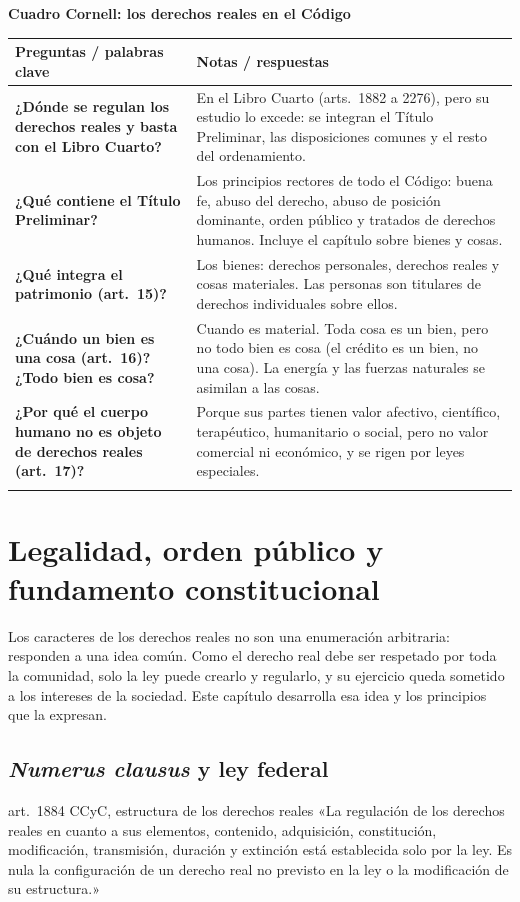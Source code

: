 \documentclass[12pt,oneside]{book}
\renewcommand{\arraystretch}{1.25}
\newcommand{\cq}[2]{\textbf{#1} & #2 \\[0.45em]}
\newcommand{\cornell}[3]{%
\par\bigskip\noindent\textbf{\large Cuadro Cornell: #1}\par\smallskip
\begin{center}
\small
\renewcommand{\arraystretch}{1.15}
\begin{tabularx}{\textwidth}{>{\raggedright\arraybackslash}p{0.27\textwidth}>{\raggedright\arraybackslash}X}
\toprule
\textbf{Preguntas / palabras clave} & \textbf{Notas / respuestas} \\
\midrule
#2
\midrule
\multicolumn{2}{p{\dimexpr\textwidth-2\tabcolsep\relax}}{\textbf{Resumen.} #3} \\
\bottomrule
\end{tabularx}
\end{center}
}
\begin{document}
\cornell{los derechos reales en el Código}{
\cq{¿Dónde se regulan los derechos reales y basta con el Libro Cuarto?}{En el Libro Cuarto (arts.~1882 a 2276), pero su estudio lo excede: se integran el Título Preliminar, las disposiciones comunes y el resto del ordenamiento.}
\cq{¿Qué contiene el Título Preliminar?}{Los principios rectores de todo el Código: buena fe, abuso del derecho, abuso de posición dominante, orden público y tratados de derechos humanos. Incluye el capítulo sobre bienes y cosas.}
\cq{¿Qué integra el patrimonio (art.~15)?}{Los bienes: derechos personales, derechos reales y cosas materiales. Las personas son titulares de derechos individuales sobre ellos.}
\cq{¿Cuándo un bien es una cosa (art.~16)? ¿Todo bien es cosa?}{Cuando es material. Toda cosa es un bien, pero no todo bien es cosa (el crédito es un bien, no una cosa). La energía y las fuerzas naturales se asimilan a las cosas.}
\cq{¿Por qué el cuerpo humano no es objeto de derechos reales (art.~17)?}{Porque sus partes tienen valor afectivo, científico, terapéutico, humanitario o social, pero no valor comercial ni económico, y se rigen por leyes especiales.}
}{Los derechos reales se regulan en el Libro Cuarto, cuyos arts.~1882 a 1891 contienen los principios comunes. Los arts.~15, 16 y 17 fijan la titularidad sobre los bienes del patrimonio, el concepto de cosa como bien material con valor económico y la exclusión del cuerpo humano como objeto de derechos reales.}

\chapter[Legalidad, orden público y fundamento constitucional]{Legalidad, orden público y fundamento constitucional}\label{cap:legalidad}

Los caracteres de los derechos reales no son una enumeración arbitraria: responden a una idea común. Como el derecho real debe ser respetado por toda la comunidad, solo la ley puede crearlo y regularlo, y su ejercicio queda sometido a los intereses de la sociedad. Este capítulo desarrolla esa idea y los principios que la expresan.

\section{\textit{Numerus clausus} y ley federal}

\begin{regla}{art.~1884 CCyC, estructura de los derechos reales}
«La regulación de los derechos reales en cuanto a sus elementos, contenido, adquisición, constitución, modificación, transmisión, duración y extinción está establecida solo por la ley. Es nula la configuración de un derecho real no previsto en la ley o la modificación de su estructura.»
\end{regla}
\end{document}
